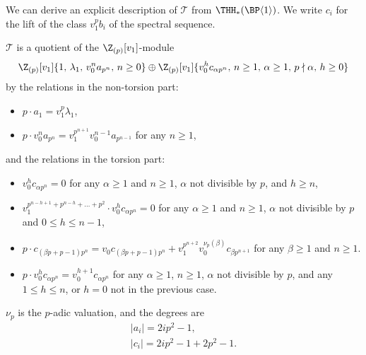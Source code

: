 \begin{remark}
  We can derive an explicit description of $\mathcal{T}$ from $\THH_*(\BP \langle 1 \rangle)$. We write $c_i$ for the lift of the class $v_1^p b_i$ of the spectral sequence.

  $\mathcal{T}$ is a quotient of the $\Z_{(p)}[v_1]$-module
  \begin{multline}
    \Z_{(p)}[v_1]\{1,\, \lambda_1,\, v_0^n a_{p^n},\,n\geq 0\} 
    \oplus \Z_{(p)}[v_1]\{v_0^h c_{\alpha p^n},\, n\geq 1,\, \alpha\geq 1,\, p\nmid \alpha,\, h \geq 0\}
  \end{multline}
  by the relations in the non-torsion part:
  \begin{itemize}
  \item $p\cdot a_1 = v_1^p \lambda_1$,
  \item $p\cdot v_0^n a_{p^n} = v_1^{p^{n+1}}v_0^{n-1} a_{p^{n-1}}$ for any $n\geq 1$,
  \end{itemize}
  and the relations in the torsion part:
  \begin{itemize}
  \item $v_0^{h} c_{\alpha p^n} = 0$ for any $\alpha \geq 1$ and $n \geq 1$, $\alpha$ not divisible by $p$, and $h \geq n$,
  \item $v_1^{p^{n-h+1}+p^{n-h}+\dots+p^2 }\cdot v_0^h c_{\alpha p^n} = 0$ for any $\alpha \geq 1$ and $n \geq 1$, $\alpha$ not divisible by $p$ and  $0 \leq h \leq n - 1$,
  \item $p\cdot c_{(\beta p+p-1)p^n} = v_0 c_{(\beta p+p-1)p^n}+v_1^{p^{n+2}}v_0^{\nu_p(\beta)} c_{\beta p^{n+1}}$ for any $\beta \geq 1$ and $n \geq 1$.
  \item $p\cdot v_0^h c_{\alpha p^n} = v_0^{h+1} c_{\alpha p^n}$ for any $\alpha \geq 1$, $n \geq 1$, $\alpha$ not divisible by $p$, and any $1 \leq h \leq n$, or $h=0$ not in the previous case.
  \end{itemize}

  $\nu_p$ is the $p$-adic valuation, and the degrees are
  \begin{equation}
    \begin{gathered}
      |a_i| = 2ip^2 - 1, \\
      |c_i| = 2ip^2 - 1 + 2p^2 - 1.
    \end{gathered}
  \end{equation}
\end{remark}


